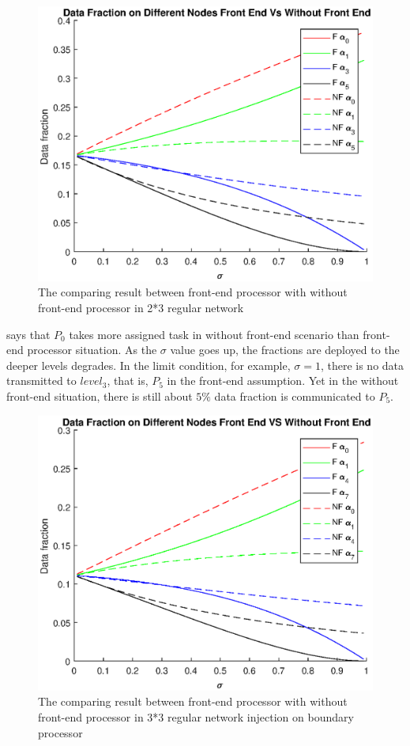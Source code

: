 \begin{figure}[!ht]
\centering
\includegraphics[width=1\columnwidth]{figure/2t3_c.eps}
\caption{The comparing result between front-end processor with without front-end processor in 2*3 regular network }
\label{fig:2t3_c}
\end{figure}
\newpage

 says that $P_{0}$ takes more assigned task in without front-end scenario than front-end processor situation.  As the $\sigma$ value goes up, the fractions are deployed to the deeper levels degrades.  In the limit condition, for example, $\sigma  = 1$,  there is no data transmitted to $level_{3}$, that is, $P_{5}$ in the front-end assumption.  Yet in the without front-end situation,  there is still about $5\%$ data fraction is communicated to $P_{5}$.  
\newpage 

\begin{figure}[!ht]
\centering
\includegraphics[width=1\columnwidth]{figure/3t3b_c.eps}
\caption{The comparing result between front-end processor with without front-end processor in 3*3 regular network injection on boundary processor }
\label{fig:3t3b_c}
\end{figure}

